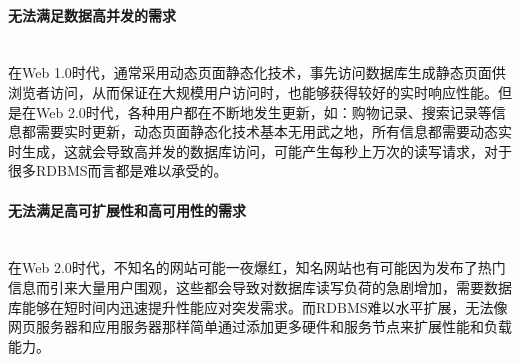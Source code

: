 \documentclass{article}
\begin{document}
\begin{large}
  \paragraph{无法满足数据高并发的需求}\mbox{} \\
  在Web 1.0时代，通常采用动态页面静态化技术，事先访问数据库生成静态页面供浏览者访问，从而保证在大规模用户访问时，也能够获得较好的实时响应性能。但是在Web 2.0时代，各种用户都在不断地发生更新，如：购物记录、搜索记录等信息都需要实时更新，动态页面静态化技术基本无用武之地，所有信息都需要动态实时生成，这就会导致高并发的数据库访问，可能产生每秒上万次的读写请求，对于很多RDBMS而言都是难以承受的。

  \paragraph{无法满足高可扩展性和高可用性的需求}\mbox{} \\
  在Web 2.0时代，不知名的网站可能一夜爆红，知名网站也有可能因为发布了热门信息而引来大量用户围观，这些都会导致对数据库读写负荷的急剧增加，需要数据库能够在短时间内迅速提升性能应对突发需求。而RDBMS难以水平扩展，无法像网页服务器和应用服务器那样简单通过添加更多硬件和服务节点来扩展性能和负载能力。


\end{large}
\end{document}
